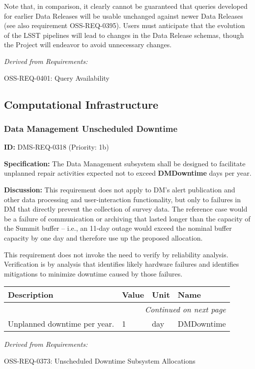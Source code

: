 \documentclass[SE,toc,lsstdraft]{lsstdoc}
\makeatletter
\newcommand{\paramname}[1]{\hspace{0pt}#1}
\newcommand{\unitname}[1]{\hspace{0pt}#1}
\newenvironment{parameters}[0]{%
\setlength\LTleft{0pt}
\setlength\LTright{\fill}
\begin{small}
\begin{longtable}[]{|p{0.49\textwidth}|l|p{0.6in}|p{1.70in}@{}|}

\hline \textbf{Description} & \textbf{Value} & \textbf{Unit} & \textbf{Name} \\ \hline
\endhead

\hline \multicolumn{4}{r}{\emph{Continued on next page}} \\
\endfoot

\hline\hline
\endlastfoot
}{%
\hline
\end{longtable}
\end{small}
}
\makeatother
\begin{document}
Note that, in comparison, it clearly cannot be guaranteed that queries developed for earlier Data Releases will be usable unchanged against newer Data Releases (see also requirement OSS-REQ-0395). Users must anticipate that the evolution of the LSST pipelines will lead to changes in the Data Release schemas, though the Project will endeavor to avoid unnecessary changes.

\emph{Derived from Requirements:}

OSS-REQ-0401:
Query Availability \newline

\subsection{Computational Infrastructure}

\subsubsection{Data Management Unscheduled Downtime}

\label{DMS-REQ-0318}
\textbf{ID:} DMS-REQ-0318 (Priority: 1b)

\textbf{Specification:} The Data Management subsystem shall be designed to facilitate unplanned repair activities expected not to exceed \textbf{DMDowntime} days per year.

\textbf{Discussion:} This requirement does not apply to DM's alert publication and other data processing and user-interaction functionality, but only to failures in DM that directly prevent the collection of survey data. The reference case would be a failure of communication or archiving that lasted longer than the capacity of the Summit buffer -- i.e., an 11-day outage would exceed the nominal buffer capacity by one day and therefore use up the proposed allocation.

This requirement does not invoke the need to verify by reliability analysis. Verification is by analysis that identifies likely hardware failures and identifies mitigations to minimize downtime caused by those failures.

\begin{parameters}
Unplanned downtime per year.
&
1
&
\unitname{%
day
}
&
\paramname{%
DMDowntime
} \\\hline
\end{parameters}

\emph{Derived from Requirements:}

OSS-REQ-0373:
Unscheduled Downtime Subsystem Allocations \newline
\end{document}
